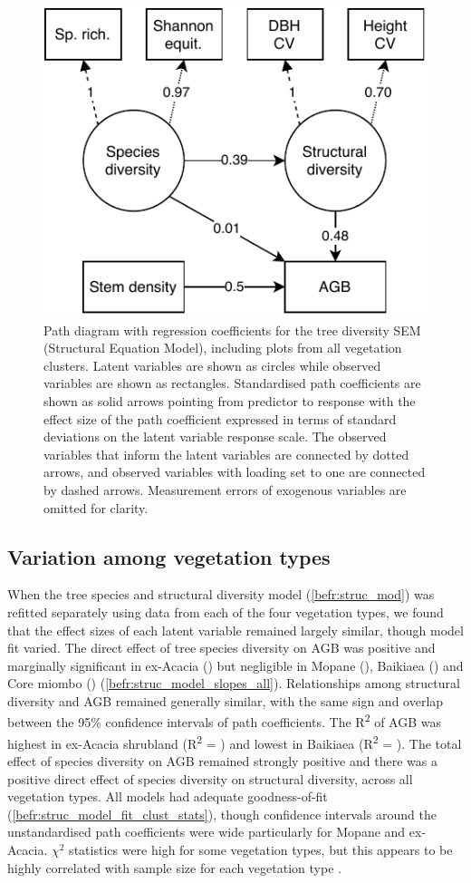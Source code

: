 \begin{refsection}


\begin{figure}
	\includegraphics[width=0.5\linewidth]{img/struc.drawio}
	\caption[Path diagram for vegetation type model]{Path diagram with regression coefficients for the tree diversity SEM (Structural Equation Model), including plots from all vegetation clusters. Latent variables are shown as circles while observed variables are shown as rectangles. Standardised path coefficients are shown as solid arrows pointing from predictor to response with the effect size of the path coefficient expressed in terms of standard deviations on the latent variable response scale. The observed variables that inform the latent variables are connected by dotted arrows, and observed variables with loading set to one are connected by dashed arrows. Measurement errors of exogenous variables are omitted for clarity.}
	\label{befr:struc_mod}
\end{figure}

\subsection{Variation among vegetation types}
\label{befr:ssec:veg}

When the tree species and structural diversity model (\autoref{befr:struc_mod}) was refitted separately using data from each of the four vegetation types, we found that the effect sizes of each latent variable remained largely similar, though model fit varied. The direct effect of tree species diversity on AGB was positive and marginally significant in ex-Acacia (\strucbetacsb{}) but negligible in Mopane (\strucbetadsb{}), Baikiaea (\strucbetaasb{}) and Core miombo (\strucbetabsb{}) (\autoref{befr:struc_model_slopes_all}). Relationships among structural diversity and AGB remained generally similar, with the same sign and overlap between the 95\% confidence intervals of path coefficients. The R\textsuperscript{2} of AGB was highest in ex-Acacia shrubland (R\textsuperscript{2} = \struccrsq{}) and lowest in Baikiaea (R\textsuperscript{2} = \strucarsq{}). The total effect of species diversity on AGB remained strongly positive and there was a positive direct effect of species diversity on structural diversity, across all vegetation types. All models had adequate goodness-of-fit (\autoref{befr:struc_model_fit_clust_stats}), though confidence intervals around the unstandardised path coefficients were wide particularly for Mopane and ex-Acacia. $\chi^{2}$ statistics were high for some vegetation types, but this appears to be highly correlated with sample size for each vegetation type \citep{Hooper2008}.


\end{refsection}
